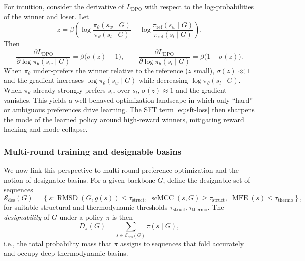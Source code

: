 {{For intuition, consider the derivative of $L_{\text{DPO}}$ with respect to
the log-probabilities of the winner and loser. Let
\begin{equation}
    z
    =
    \beta\left(
        \log\frac{\pi_\theta(s_w \mid G)}{\pi_\theta(s_l \mid G)}
        -
        \log\frac{\pi_{\text{ref}}(s_w \mid G)}{\pi_{\text{ref}}(s_l \mid G)}
    \right).
\end{equation}
Then
\begin{equation}
    \frac{\partial L_{\text{DPO}}}{\partial \log \pi_\theta(s_w \mid G)}
    =
    \beta \bigl(\sigma(z) - 1\bigr),
    \qquad
    \frac{\partial L_{\text{DPO}}}{\partial \log \pi_\theta(s_l \mid G)}
    =
    \beta \bigl(1 - \sigma(z)\bigr).
    \label{eq:dpo-grads}
\end{equation}
When $\pi_\theta$ under-prefers the winner relative to the reference
($z$ small), $\sigma(z) \ll 1$ and the gradient increases
$\log \pi_\theta(s_w \mid G)$ while decreasing $\log \pi_\theta(s_l \mid G)$.
When $\pi_\theta$ already strongly prefers $s_w$ over $s_l$, $\sigma(z)
\approx 1$ and the gradient vanishes. This yields a well-behaved optimization
landscape in which only ``hard'' or ambiguous preferences drive learning.
The SFT term \eqref{eq:sft-loss} then sharpens the mode of the learned
policy around high-reward winners, mitigating reward hacking and mode collapse.

\subsubsection{Multi-round training and designable basins}

We now link this perspective to multi-round preference optimization and the notion of
designable basins. For a given backbone $G$, define the designable set of
sequences
\begin{equation}
    \mathcal{S}_{\text{des}}(G)
    =
    \left\{
        s :
        \operatorname{RMSD}(G, g(s)) \le \tau_{\text{struct}},
        \;
        \operatorname{scMCC}(s, G) \ge \tau_{\text{struct}},
        \;
        \operatorname{MFE}(s) \le \tau_{\text{thermo}}
    \right\},
    \label{eq:designable-set}
\end{equation}
for suitable structural and thermodynamic thresholds
$\tau_{\text{struct}}, \tau_{\text{thermo}}$.
The \emph{designability} of $G$ under a policy $\pi$ is then
\begin{equation}
    D_\pi(G)
    =
    \sum_{s \in \mathcal{S}_{\text{des}}(G)} \pi(s \mid G),
    \label{eq:designability}
\end{equation}
i.e., the total probability mass that $\pi$ assigns to sequences that fold
accurately and occupy deep thermodynamic basins.

}}
